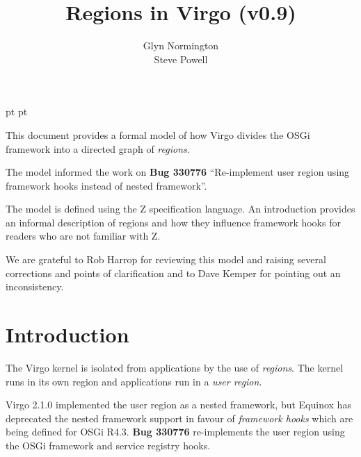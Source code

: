 \documentclass[a4paper,9pt]{article}
\begin{document}
 pt
 pt

\title{Regions in Virgo (v0.9)}
\author{Glyn Normington\\Steve Powell}

\maketitle
\thispagestyle{myheadings}
\setcounter{page}{0}

This document provides a formal model of how Virgo divides the OSGi framework into a directed graph
of \textit{regions}.

The model informed the work on \textbf{Bug 330776} ``Re-implement user region using
framework hooks instead of nested framework''.

The model is defined using the Z specification language. An introduction provides an informal
description of regions and how they influence framework hooks for readers who are not familiar with Z.

We are grateful to Rob Harrop for reviewing this model and raising several corrections and
points of clarification and to Dave Kemper for pointing out an inconsistency.

\clearpage
{}
\tableofcontents

\newcommand{\true}{true}
\newcommand{\false}{false}
\renewcommand{\emptyset}{\varnothing}
\newcommand{\ModuleDefZero}{ModuleDef_0}
\newcommand{\ModuleDefOne}{ModuleDef_1}
\newcommand{\ModuleDefTwo}{ModuleDef_2}
\newcommand{\ModuleDefThree}{ModuleDef_3}
\newcommand{\ModuleDefFour}{ModuleDef_4}

\clearpage
{}
\section{Introduction}
\label{cha:intro}

The Virgo kernel is isolated from applications by the use of \textit{regions}.
The kernel runs in its own region and applications run in a \textit{user region}.

Virgo 2.1.0 implemented the user region as a nested framework, but Equinox
has deprecated the nested framework support in favour of \textit{framework hooks}
which are being defined for OSGi R4.3.
\textbf{Bug 330776} re-implements the user region using the OSGi framework and service
registry hooks.
\end{document}
